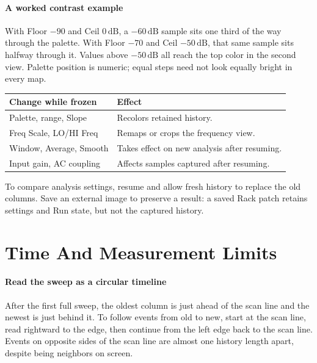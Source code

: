 \paragraph{A worked contrast example}
With Floor $-90$ and Ceil $0\,\mathrm{dB}$, a $-60\,\mathrm{dB}$ sample
sits one third of the way through the palette. With Floor $-70$ and Ceil
$-50\,\mathrm{dB}$, that same sample sits halfway through it. Values above
$-50\,\mathrm{dB}$ all reach the top color in the second view. Palette
position is numeric; equal steps need not look equally bright in every map.

\begin{center}
\renewcommand{\arraystretch}{1.2}
\begin{tabularx}{\textwidth}{@{}p{}X@{}}
\toprule
\textbf{Change while frozen} & \textbf{Effect} \\
\midrule
Palette, range, Slope & Recolors retained history. \\
Freq Scale, LO/HI Freq & Remaps or crops the frequency view. \\
Window, Average, Smooth & Takes effect on new analysis after resuming. \\
Input gain, AC coupling & Affects samples captured after resuming. \\
\bottomrule
\end{tabularx}
\end{center}

To compare analysis settings, resume and allow fresh history to replace the
old columns. Save an external image to preserve a result: a saved Rack patch
retains settings and Run state, but not the captured history.

\clearpage
\section{Time And Measurement Limits}\label{sec:time}

\paragraph{Read the sweep as a circular timeline}
After the first full sweep, the oldest column is just ahead of the scan line
and the newest is just behind it. To follow events from old to new, start at
the scan line, read rightward to the edge, then continue from the left edge
back to the scan line. Events on opposite sides of the scan line are almost
one history length apart, despite being neighbors on screen.

